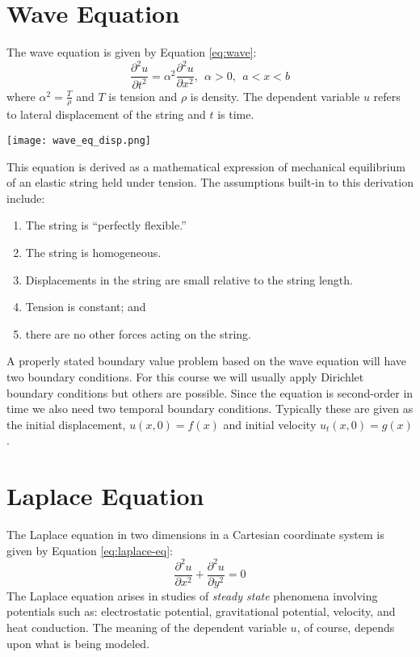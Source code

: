 \section{Wave Equation}

The wave equation is given by Equation \ref{eq:wave}:
\begin{equation}
\frac{\partial^2 u}{\partial t^2} = \alpha^2 \frac{\partial^2 u}{\partial x^2}, \ \ \alpha>0, \ \ a<x<b
\label{eq:wave}
\end{equation}
where $\alpha^2 = \frac{T}{\rho}$ and $T$ is tension and $\rho$ is density.  The dependent variable $u$ refers to lateral displacement of the string and $t$ is time.
\begin{marginfigure}
\texttt{[image: wave\_eq\_disp.png]}
\end{marginfigure}

This equation is derived as a mathematical expression of mechanical equilibrium of an elastic string held under tension.  The assumptions built-in to this derivation include:
\begin{enumerate}
\item The string is ``perfectly flexible.'' 
\item The string is homogeneous.
\item Displacements in the string are small relative to the string length.
\item Tension is constant; and
\item there are no other forces acting on the string.
\end{enumerate}
A properly stated boundary value problem based on the wave equation will have two boundary conditions.  For this course we will usually apply Dirichlet boundary conditions but others are possible.  Since the equation is second-order in time we also need two temporal boundary conditions.  Typically these are given as the initial displacement, $u(x,0)=f(x)$ and initial velocity $u_t(x,0)=g(x)$.

\section{Laplace Equation}
The Laplace equation in two dimensions in a Cartesian coordinate system is given by Equation \ref{eq:laplace-eq}:
\begin{equation}
\frac{\partial^2 u}{\partial x^2} + \frac{\partial^2 u}{\partial y^2} = 0
\label{eq:laplace-eq}
\end{equation}
The Laplace equation arises in studies of \emph{steady state} phenomena involving potentials such as: electrostatic potential, gravitational potential, velocity, and heat conduction.  The meaning of the dependent variable $u$, of course, depends upon what is being modeled.  

